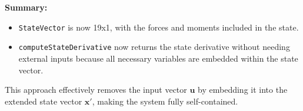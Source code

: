 \documentclass{article}
\begin{document}
\textbf{Summary:}
\begin{itemize}
    \item \texttt{StateVector} is now 19x1, with the forces and moments included in the state.
    \item \texttt{computeStateDerivative} now returns the state derivative without needing external inputs because all necessary variables are embedded within the state vector.
\end{itemize}

This approach effectively removes the input vector \(\mathbf{u}\) by embedding it into the extended state vector \(\mathbf{x}'\), making the system fully self-contained.
\end{document}
